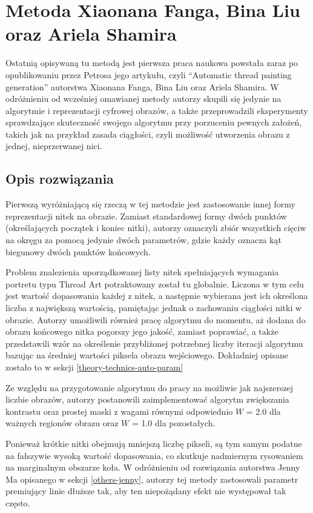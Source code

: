     \section{Metoda Xiaonana Fanga, Bina Liu oraz Ariela Shamira} \label{others-xiao}
    Ostatnią opisywaną tu metodą jest pierwsza praca naukowa powstała zaraz po opublikowaniu przez Petrosa jego artykułu, czyli ``Automatic thread painting generation'' autorstwa Xiaonana Fanga, Bina Liu oraz Ariela Shamira. W odróżnieniu od wcześniej omawianej metody autorzy skupili się jedynie na algorytmie i reprezentacji cyfrowej obrazów, a także przeprowadzili eksperymenty sprawdzające skuteczność swojego algorytmu przy porzuceniu pewnych założeń, takich jak na przykład zasada ciągłości, czyli możliwość utworzenia obrazu z jednej, nieprzerwanej nici.
    
        \subsection{Opis rozwiązania}
        Pierwszą wyróżniającą się rzeczą w tej metodzie jest zastosowanie innej formy reprezentacji nitek na obrazie. Zamiast standardowej formy dwóch punktów (określających początek i koniec nitki), autorzy oznaczyli zbiór wszystkich cięciw na okręgu za pomocą jedynie dwóch parametrów, gdzie każdy oznacza kąt biegunowy dwóch punktów końcowych.
        
        Problem znalezienia uporządkowanej listy nitek spełniających wymagania portretu typu Thread Art potraktowany został tu globalnie. Liczona w tym celu jest wartość dopasowania każdej z nitek, a następnie wybierana jest ich określona liczba z największą wartością, pamiętając jednak o zachowaniu ciągłości nitki w obrazie. Autorzy umożliwili również pracę algorytmu do momentu, aż dodana do obrazu końcowego nitka pogorszy jego jakość, zamiast poprawiać, a także przedstawili wzór na określenie przybliżonej potrzebnej liczby iteracji algorytmu bazując na średniej wartości piksela obrazu wejściowego. Dokładniej opisane zostało to w sekcji \ref{theory-technics-auto-param}
        
        Ze względu na przygotowanie algorytmu do pracy na możliwie jak najszerszej liczbie obrazów, autorzy postanowili zaimplementować algorytm zwiększania kontrastu oraz prostej maski z wagami równymi odpowiednio \(W\) = 2.0 dla ważnych regionów obrazu oraz \(W\) = 1.0 dla pozostałych.
        
        Ponieważ krótkie nitki obejmują mniejszą liczbę pikseli, są tym samym podatne na fałszywie wysoką wartość dopasowania, co skutkuje nadmiernym rysowaniem na marginalnym obszarze koła. W odróżnieniu od rozwiązania autorstwa Jenny Ma opisanego w sekcji \ref{others-jenny}, autorzy tej metody zastosowali parametr premiujący linie dłuższe tak, aby ten niepożądany efekt nie występował tak często. 
        
